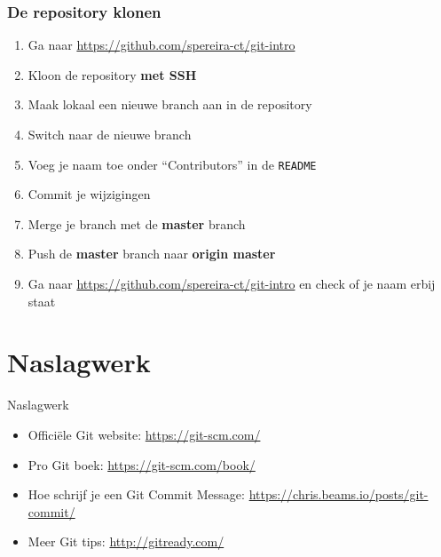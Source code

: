 \documentclass[]{beamer}
\begin{document}
\begin{frame}
    \frametitle{De repository klonen}

    \begin{enumerate}
        \item Ga naar \url{https://github.com/spereira-ct/git-intro}
        \item Kloon de repository \textbf{met SSH}
        \item Maak lokaal een nieuwe branch aan in de repository
        \item Switch naar de nieuwe branch
        \item Voeg je naam toe onder ``Contributors'' in de \texttt{README}
        \item Commit je wijzigingen
        \item Merge je branch met de \textbf{master} branch
        \item Push de \textbf{master} branch naar \textbf{origin master}
        \item Ga naar \url{https://github.com/spereira-ct/git-intro} en check of je naam erbij staat
    \end{enumerate}
\end{frame}

\section*{Naslagwerk}

\begin{frame}{Naslagwerk}
    \begin{itemize}
    \item Officiële Git website: \url{https://git-scm.com/}
    \item Pro Git boek: \url{https://git-scm.com/book/}
    \item Hoe schrijf je een Git Commit Message: \url{https://chris.beams.io/posts/git-commit/}
    \item Meer Git tips: \url{http://gitready.com/}
    \end{itemize}
\end{frame}
\end{document}
